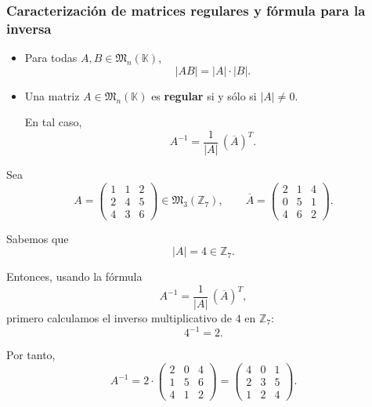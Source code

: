 \documentclass[a4paper,12pt]{article}
\begin{document}
\subsubsection{Caracterización de matrices regulares y fórmula para la inversa}

\begin{procedimiento}[title=Propiedad y fórmula para la inversa]
\begin{itemize}
    \item Para todas $A,B \in \mathfrak{M}_n(\mathbb{K})$,
    \[
    |A B| = |A| \cdot |B|.
    \]

    \item Una matriz $A \in \mathfrak{M}_n(\mathbb{K})$ es \textbf{regular} si y sólo si \(|A| \neq 0.\)
    
    En tal caso,
    \[
    A^{-1} = \frac{1}{|A|} \, (\overline{A})^{T}.
    \]
\end{itemize}
\end{procedimiento}

\begin{ejemplo}[title=Ejemplo de cálculo de la inversa con la adjunta]
Sea
\[
A =
\begin{pmatrix}
1 & 1 & 2 \\
2 & 4 & 5 \\
4 & 3 & 6
\end{pmatrix}
\in \mathfrak{M}_3(\mathbb{Z}_7),
\qquad
\overline{A} =
\begin{pmatrix}
2 & 1 & 4 \\
0 & 5 & 1 \\
4 & 6 & 2
\end{pmatrix}.
\]

Sabemos que
\[
|A| = 4 \in \mathbb{Z}_7.
\]

Entonces, usando la fórmula
\[
A^{-1} = \frac{1}{|A|}\, (\overline{A})^T,
\]
primero calculamos el inverso multiplicativo de $4$ en $\mathbb{Z}_7$:
\[
4^{-1} = 2.
\]

Por tanto,
\[
A^{-1}
= 2 \cdot
\begin{pmatrix}
2 & 0 & 4 \\
1 & 5 & 6 \\
4 & 1 & 2
\end{pmatrix}
=
\begin{pmatrix}
4 & 0 & 1 \\
2 & 3 & 5 \\
1 & 2 & 4
\end{pmatrix}.
\]

\end{ejemplo}
\end{document}

